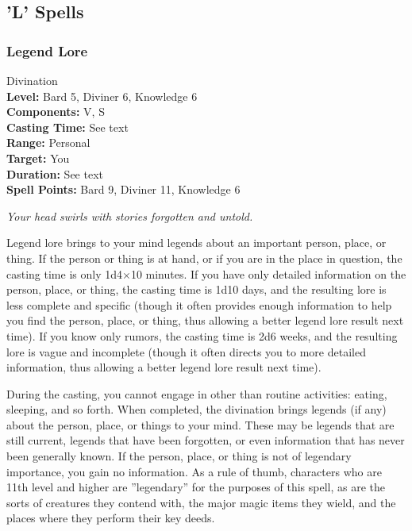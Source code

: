 \subsection{'L' Spells}

\subsubsection{Legend Lore}
\label{Spell:LegendLore}
Divination
\\ \textbf{Level:} Bard 5, Diviner 6, Knowledge 6
\\ \textbf{Components:} V, S
\\ \textbf{Casting Time:} See text
\\ \textbf{Range:} Personal
\\ \textbf{Target:} You
\\ \textbf{Duration:} See text
\\ \textbf{Spell Points:} Bard 9, Diviner 11, Knowledge 6

\emph{Your head swirls with stories forgotten and untold.}

Legend lore brings to your mind legends about an important person, place, or thing.
If the person or thing is at hand, or if you are in the place in question, the casting time is only 1d4$\times$10 minutes.
If you have only detailed information on the person, place, or thing, the casting time is 1d10 days, 
and the resulting lore is less complete and specific 
(though it often provides enough information to help you find the person, place, or thing, thus allowing a better legend lore result next time). 
If you know only rumors, the casting time is 2d6 weeks, and the resulting lore is vague and incomplete 
(though it often directs you to more detailed information, thus allowing a better legend lore result next time).

During the casting, you cannot engage in other than routine activities: eating, sleeping, and so forth. 
When completed, the divination brings legends (if any) about the person, place, or things to your mind. 
These may be legends that are still current, legends that have been forgotten, or even information that has never been generally known.
If the person, place, or thing is not of legendary importance, you gain no information.
As a rule of thumb, characters who are 11th level and higher are ''legendary'' for the purposes of this spell,
as are the sorts of creatures they contend with, the major magic items they wield, and the places where they perform their key deeds. 


